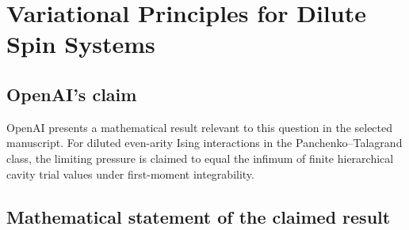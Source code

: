 \documentclass[11pt]{article}
\begin{document}
\section*{Variational Principles for Dilute Spin Systems}

\subsection{OpenAI's claim}
OpenAI presents a mathematical result relevant to this question in the selected manuscript. For diluted even-arity Ising interactions in the Panchenko--Talagrand class, the limiting pressure is claimed to equal the infimum of finite hierarchical cavity trial values under first-moment integrability.

\subsection{Mathematical statement of the claimed result}
\end{document}
